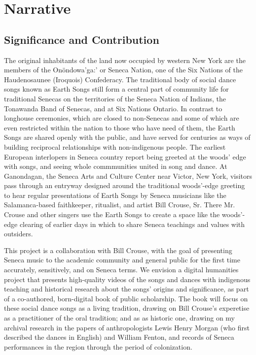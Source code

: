 \documentclass{neh}
\begin{document}
\section{Narrative}
\subsection{Significance and Contribution}
The original inhabitants of the land now occupied by western New York are the
members of the Onöndowa’ga:’ or Seneca Nation, one of the Six Nations of the
Haudenosaunee (Iroquois) Confederacy.
The traditional body of social dance songs known as Earth Songs still form a
central part of community life for traditional Senecas on the territories of
the Seneca Nation of Indians, the Tonawanda Band of Senecas, and at Six
Nations Ontario.
In contrast to longhouse ceremonies, which are closed to non-Senecas and some
of which are even restricted within the nation to those who have need of them,
the Earth Songs are shared openly with the public, and have served for
centuries as ways of building reciprocal relationships with non-indigenous
people.
The earliest European interlopers in Seneca country report being greeted at
the woods' edge with songs, and seeing whole commmunities united in song and
dance.
At Ganondagan, the Seneca Arts and Culture Center near Victor, New York,
visitors pass through an entryway designed around the traditional woods'-edge
greeting to hear regular presentations of Earth Songs by Seneca musicians like
the Salamanca-based faithkeeper, ritualist, and artist Bill Crouse, Sr.
There Mr. Crouse and other singers use the Earth Songs to create a space like
the woods'-edge clearing of earlier days in which to share Seneca teachings
and values with outsiders.

This project is a collaboration with Bill Crouse, with the goal of presenting
Seneca music to the academic community and general public for the first time
accurately, sensitively, and on Seneca terms.
We envision a digital humanities project that presents high-quality videos of
the songs and dances with indigenous teaching and historical research about
the songs' origins and significance, as part of a co-authored, born-digital
book of public scholarship.
The book will focus on these social dance songs as a living tradition, drawing
on Bill Crouse's experetise as a practitioner of the oral tradition; and as as
historic one, drawing on my archival research in the papers of anthropologists
Lewis Henry Morgan (who first described the dances in English) and William
Fenton, and records of Seneca performances in the region through the
period of colonization.
\end{document}
